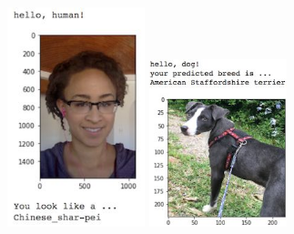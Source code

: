 \documentclass[paper=A4, DIV=11, parskip=half]{scrartcl}
\begin{document}
\begin{center}
\includegraphics[width=4cm]{images/sample_human_output.jpg}
\includegraphics[width=4cm]{images/sample_dog_output.jpg}
\end{center}



\end{document}
